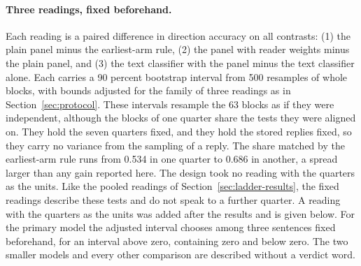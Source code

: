 \paragraph{Three readings, fixed beforehand.} Each reading is a paired difference in direction accuracy on all contrasts: (1) the plain panel minus the earliest-arm rule, (2) the panel with reader weights minus the plain panel, and (3) the text classifier with the panel minus the text classifier alone. Each carries a 90 percent bootstrap interval from 500 resamples of whole blocks, with bounds adjusted for the family of three readings as in Section~\ref{sec:protocol}. These intervals resample the 63 blocks as if they were independent, although the blocks of one quarter share the tests they were aligned on. They hold the seven quarters fixed, and they hold the stored replies fixed, so they carry no variance from the sampling of a reply. The share matched by the earliest-arm rule runs from 0.534 in one quarter to 0.686 in another, a spread larger than any gain reported here. The design took no reading with the quarters as the units. Like the pooled readings of Section~\ref{sec:ladder-results}, the fixed readings describe these tests and do not speak to a further quarter. A reading with the quarters as the units was added after the results and is given below. For the primary model the adjusted interval chooses among three sentences fixed beforehand, for an interval above zero, containing zero and below zero. The two smaller models and every other comparison are described without a verdict word.

\begin{table}[t]\centering\footnotesize
\caption{The three readings of the simulated readers for the three models, in the run through the command line tool (run 11) and in the run of the same requests through the vendor's programming interface (run 12). The upper rows give the direction accuracy of the three references and of each model's plain panel on the 5,966 contrasts of the headline-only cell. Each reading is a paired difference in direction accuracy with an interval at 90 percent from a bootstrap of 500 resamples of whole blocks. The bounds printed are the ones adjusted for the family of three readings. The last column gives the words fixed before the first call, chosen by the adjusted interval of the primary model in run 11. No other row carries a verdict. Opus is the primary model, and Sonnet and Haiku are the middle and the smallest model. The earliest-arm rule always picks the headline written first. The direction ceiling is an estimate of the accuracy of a method that knew each test's true effect.}
\label{tab:fmt-readers-readings}

\end{table}

